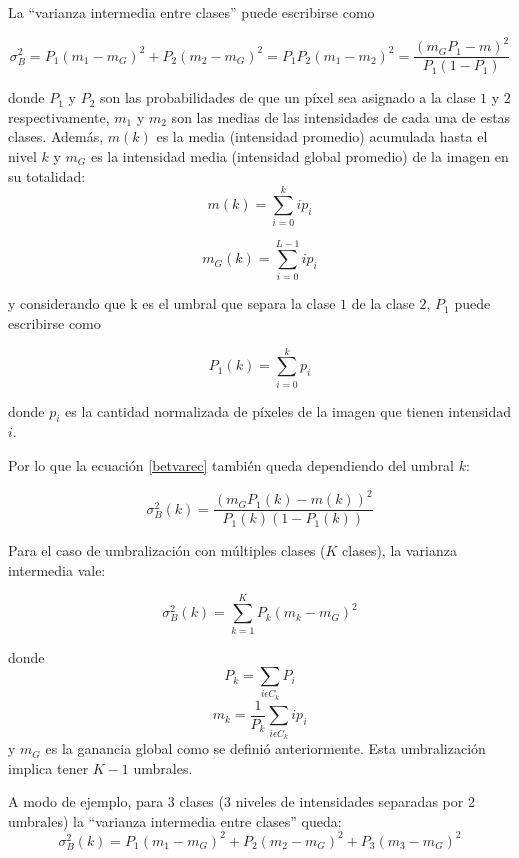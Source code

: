 La ``varianza intermedia entre clases'' puede escribirse como

\begin{equation}
{\sigma}_B^2 = P_1(m_1-m_G)^2 + P_2(m_2-m_G)^2 = P_1P_2(m_1-m_2)^2 = \frac{(m_GP_1 - m)^2}{P_1(1-P_1)}
\label{betvarec}
\end{equation}

donde $P_1$ y $P_2$ son las probabilidades de que un píxel sea asignado a la clase $1$ y $2$ respectivamente, $m_1$ y $m_2$ son las medias de las intensidades de cada una de estas clases. Además, $m(k)$ es la media (intensidad promedio) acumulada  hasta el nivel $k$ y $m_G$ es la intensidad media (intensidad global promedio) de la imagen en su totalidad:
\begin{equation}
m(k) = \sum_{i=0}^{k}ip_i
\label{mediacumulativa}
\end{equation}

\begin{equation}
m_G(k) = \sum_{i=0}^{L-1}ip_i
\label{mediaglobal}
\end{equation}

y considerando que k es el umbral que separa la clase $1$ de la clase $2$, $P_1$ puede escribirse como

\begin{equation}
 P_1(k) = \sum_{i=0}^kp_i 
 \label{peuno}
\end{equation}

donde $p_i$ es la cantidad normalizada de píxeles de la imagen que tienen intensidad $i$.

Por lo que la ecuación \ref{betvarec} también queda dependiendo del umbral $k$:

\begin{equation}
{\sigma}_B^2(k) = \frac{(m_GP_1(k) - m(k))^2}{P_1(k)(1-P_1(k))}
\label{betvarec2}
\end{equation}

Para el caso de umbralización con múltiples clases ($K$ clases), la varianza intermedia vale:

\begin{equation}
  {\sigma}_B^2(k) = \sum_{k=1}^{K}P_k(m_k-m_G)^2
  \label{betvarec3}
\end{equation}

donde $$P_k=\sum_{i{\epsilon}C_k}P_i$$ $$m_k = \frac{1}{P_k}\sum_{i{\epsilon}C_k}ip_i$$ y $m_G$ es la ganancia global como se definió anteriormente. Esta umbralización implica tener $K-1$ umbrales.

A modo de ejemplo, para 3 clases (3 niveles de intensidades separadas por 2 umbrales) la ``varianza intermedia entre clases'' queda:
\begin{equation}
  {\sigma}_B^2(k) = P_1(m_1 - m_G)^2 + P_2(m_2 - m_G)^2 + P_3(m_3 - m_G)^2
\end{equation}

